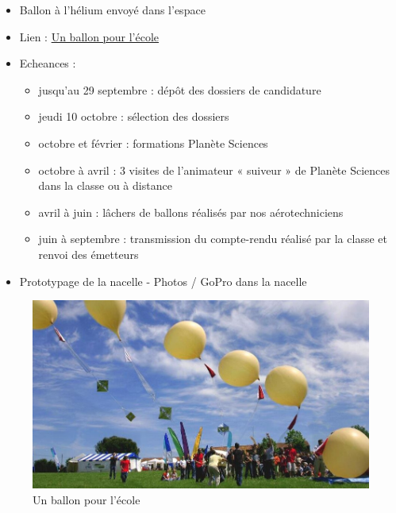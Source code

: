 \documentclass[a4paper,12pt]{article}
\begin{document}
\begin{itemize}[noitemsep]
  \item Ballon à l'hélium envoyé dans l'espace 
  \item Lien : \href{https://www.planete-sciences.org/espace/Ballon-stratospherique/Un-ballon-pour-l-ecole?lang=fr}{Un ballon pour l'école}
  \item Echeances : 
    \begin{itemize}[noitemsep]
      \item jusqu’au 29 septembre : dépôt des dossiers de candidature
      \item jeudi 10 octobre : sélection des dossiers
      \item octobre et février : formations Planète Sciences
      \item octobre à avril : 3 visites de l’animateur « suiveur » de Planète Sciences dans la classe ou à distance
      \item avril à juin : lâchers de ballons réalisés par nos aérotechniciens
      \item juin à septembre : transmission du compte-rendu réalisé par la classe et renvoi des émetteurs
    \end{itemize}
  \item Prototypage de la nacelle - Photos / GoPro dans la nacelle
  \end{itemize}

  \begin{figure}[H]
    \centering
    \includegraphics[width=0.7\linewidth]{ballon.jpg}
    \caption{\label{} Un ballon pour l'école}
  \end{figure}
\end{document}
